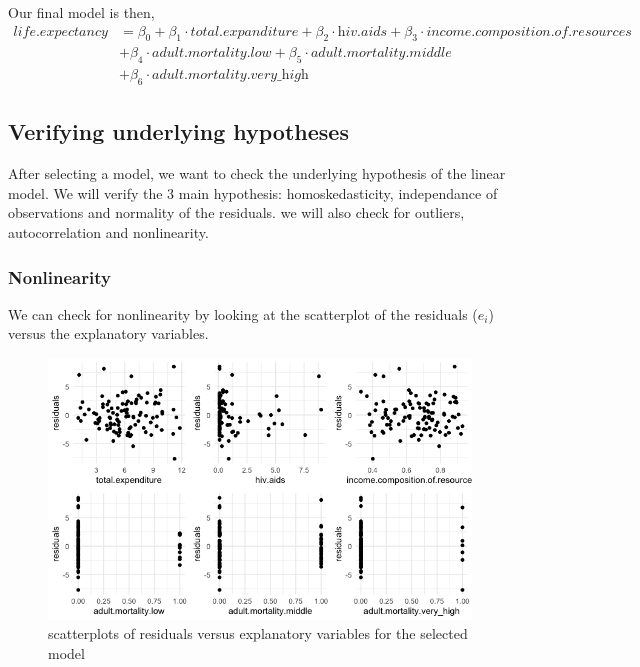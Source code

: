 Our final model is then, 
\begin{align*}
	\textit{life.expectancy} 
		&= \beta_0 + \beta_1 \cdot \textit{total.expanditure} + \beta_2 \cdot \textit{hiv.aids} + \beta_3 \cdot \textit{income.composition.of.resources} \\
		&+ \beta_4 \cdot \textit{adult.mortality.low} + \beta_5 \cdot \textit{adult.mortality.middle} \\
		&+ \beta_6 \cdot \textit{adult.mortality.very\_high}
\end{align*}

\subsection{Verifying underlying hypotheses}

After selecting a model, we want to check the underlying hypothesis of the linear model. We will verify the 3 main hypothesis: homoskedasticity, independance of observations and normality of the residuals. we will also check for outliers, autocorrelation and nonlinearity.

\subsubsection{Nonlinearity}

We can check for nonlinearity by looking at the scatterplot of the residuals ($e_i$) versus the explanatory variables.

\begin{figure}[H]
	\centering
	\includegraphics{figures/models/residuals_vs_explanatory.png}
	\caption{scatterplots of residuals versus explanatory variables for the selected model}
	\label{fig:residuals_vs_explanatory}
\end{figure}


